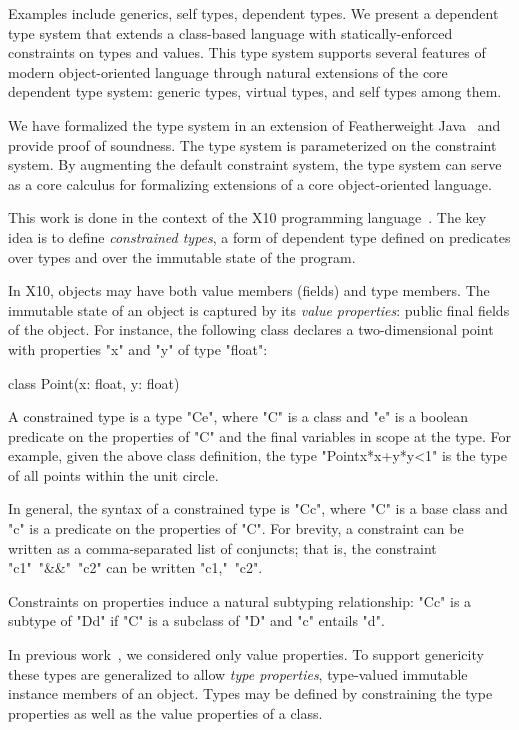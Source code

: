\documentclass[preprint,nocopyrightspace,9pt]{sigplanconf}
\begin{document}
Examples include generics, self types, 
dependent types. 
We present a dependent type system
that extends a class-based language with
statically-enforced constraints on
types and values.
This type system 
supports several features of modern object-oriented 
language through natural extensions of the core dependent type
system: generic types, virtual types, and self types
among them.

We have formalized the type system in an extension of
Featherweight Java~\cite{FJ}
and provide proof of soundness.
The type system is parameterized on the constraint system.
By augmenting the default constraint system,
the type system can serve as a core calculus 
for formalizing extensions of a core object-oriented language. 

This work is done in the context of the X10
programming language~\cite{X10}.
The key idea is to define
\emph{constrained types},
a form of dependent type
defined on predicates over types and over the immutable state of
the program.

In X10, objects may have both value members (fields)
and type members.
The immutable state of an object is captured by its
\emph{value properties}: public final fields of the object.
For instance, the following class declares a two-dimensional
point with properties \xcd"x" and \xcd"y" of type \xcd"float":
\begin{xten}
class Point(x: float, y: float) { }
\end{xten}

A constrained type is a type \xcd"C{e}", where \xcd"C" is a
class and \xcd"e" is a boolean predicate on the properties of
\xcd"C" and the final variables in scope at the type.
For example, given the above class definition,
the type \xcd"Point{x*x+y*y<1}" is the type of all
points within the unit circle.

In general, the syntax of a constrained type is
\xcd"C{c}", where \xcd"C" is a base class and
\xcd"c" is a predicate on the properties of \xcd"C".
For brevity, a constraint can be written as
a comma-separated list of conjuncts; that is, the constraint
\xcd"c1"~\xcd"&&"~\xcd"c2" can be written
\xcd"c1,"~\xcd"c2".

Constraints on properties induce a natural subtyping relationship:
\xcd"C{c}" is a subtype of
\xcd"D{d}" if \xcd"C" is a subclass of \xcd"D" and
\xcd"c" entails \xcd"d".

In previous
work~\cite{X10,constrained-types}, we considered
only value properties.
To support genericity these types are generalized
to allow \emph{type properties}, type-valued immutable instance
members of an object.
Types may be defined by constraining the type properties as
well as the value properties of a class.
\end{document}
